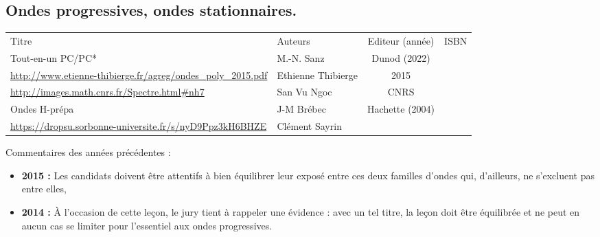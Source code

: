 \begin{headerBlock}
  \chapter{Ondes progressives, ondes stationnaires.}
  \label{LP_OndesProgressives} 
\end{headerBlock}




\begin{center}
\begin{tabularx}{\textwidth}{| X | X | c | c |}
  \hline
  \rowcolor{gray!20}\multicolumn{4}{c}{Bibliographie de la leçon : } \\
  \hline 
  Titre & Auteurs & Editeur (année) & ISBN \\
  \hline
  Tout-en-un PC/PC* & M.-N. Sanz & Dunod (2022) & \\
  \hline 
   \url{http://www.etienne-thibierge.fr/agreg/ondes_poly_2015.pdf} & Ethienne Thibierge & 2015 &    \\
   \hline
   \url{http://images.math.cnrs.fr/Spectre.html\#nh7} &  San Vu Ngoc & CNRS & \\
  \hline 
  Ondes H-prépa & J-M Brébec & Hachette (2004) & \\
  \hline
  \url{https://dropsu.sorbonne-universite.fr/s/nyD9Ppz3kH6BHZE} & Clément Sayrin & & \\
\end{tabularx}
\end{center}

\begin{reportBlock}{Commentaires des années précédentes :}
    \begin{itemize}
        \item \textbf{2015 :} Les candidats doivent être attentifs à bien équilibrer leur exposé entre ces deux familles d’ondes qui, d’ailleurs, ne s’excluent pas entre elles,
        \item \textbf{2014 :} À l’occasion de cette leçon, le jury tient à rappeler une évidence : avec un tel titre, la leçon doit être équilibrée et ne peut en aucun cas se limiter pour l’essentiel aux ondes progressives.
    \end{itemize}
\end{reportBlock}


